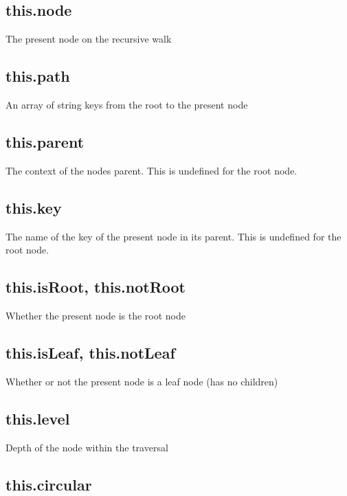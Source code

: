 \subsection*{this.\+node }

The present node on the recursive walk

\subsection*{this.\+path }

An array of string keys from the root to the present node

\subsection*{this.\+parent }

The context of the node\textquotesingle{}s parent. This is {\ttfamily undefined} for the root node.

\subsection*{this.\+key }

The name of the key of the present node in its parent. This is {\ttfamily undefined} for the root node.

\subsection*{this.\+is\+Root, this.\+not\+Root }

Whether the present node is the root node

\subsection*{this.\+is\+Leaf, this.\+not\+Leaf }

Whether or not the present node is a leaf node (has no children)

\subsection*{this.\+level }

Depth of the node within the traversal

\subsection*{this.\+circular }

